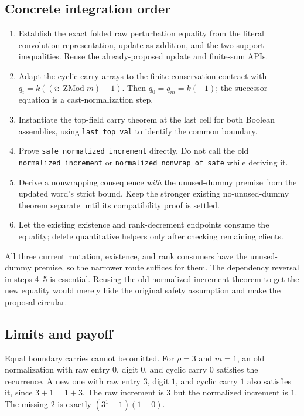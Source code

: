 \documentclass[11pt,a4paper]{article}
\newcommand{\code}[1]{\texttt{\small #1}}
\begin{document}
\subsection{Concrete integration order}

\begin{enumerate}
\item Establish the exact folded raw perturbation equality from the literal convolution representation, update-as-addition, and the two support inequalities. Reuse the already-proposed update and finite-sum APIs.
\item Adapt the cyclic carry arrays to the finite conservation contract with $q_i=k((i:\operatorname{ZMod}m)-1)$. Then $q_0=q_m=k(-1)$; the successor equation is a cast-normalization step.
\item Instantiate the top-field carry theorem at the last cell for both Boolean assemblies, using \code{last\_top\_val} to identify the common boundary.
\item Prove \code{safe\_normalized\_increment} directly. Do not call the old \code{normalized\_increment} or \code{normalized\_nonwrap\_of\_safe} while deriving it.
\item Derive a nonwrapping consequence \emph{with} the unused-dummy premise from the updated word's strict bound. Keep the stronger existing no-unused-dummy theorem separate until its compatibility proof is settled.
\item Let the existing existence and rank-decrement endpoints consume the equality; delete quantitative helpers only after checking remaining clients.
\end{enumerate}

All three current mutation, existence, and rank consumers have the unused-dummy premise, so the narrower route suffices for them. The dependency reversal in steps 4--5 is essential. Reusing the old normalized-increment theorem to get the new equality would merely hide the original safety assumption and make the proposal circular.

\subsection{Limits and payoff}

Equal boundary carries cannot be omitted. For $\rho=3$ and $m=1$, an old normalization with raw entry $0$, digit $0$, and cyclic carry $0$ satisfies the recurrence. A new one with raw entry $3$, digit $1$, and cyclic carry $1$ also satisfies it, since $3+1=1+3$. The raw increment is $3$ but the normalized increment is $1$. The missing $2$ is exactly $(3^1-1)(1-0)$.
\end{document}
